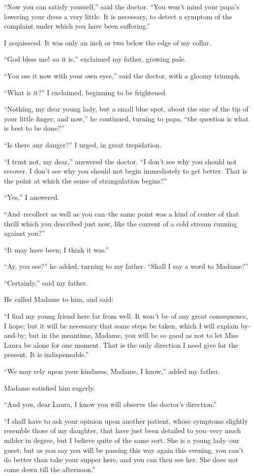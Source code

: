 \documentclass[11pt,twoside,makeidx,hidelinks,]{memoir}
\begin{document}
``Now you can satisfy yourself,'' said the doctor. ``You won't mind your
papa's lowering your dress a very little. It is necessary, to detect a
symptom of the complaint under which you have been suffering.''

I acquiesced. It was only an inch or two below the edge of my collar.

``God bless me!--so it is,'' exclaimed my father, growing pale.

``You see it now with your own eyes,'' said the doctor, with a gloomy
triumph.

``What is it?'' I exclaimed, beginning to be frightened.

``Nothing, my dear young lady, but a small blue spot, about the size of
the tip of your little finger; and now,'' he continued, turning to papa,
``the question is what is best to be done?''

``Is there any danger?'' I urged, in great trepidation.

``I trust not, my dear,'' answered the doctor. ``I don't see why you should
not recover. I don't see why you should not begin immediately to get
better. That is the point at which the sense of strangulation begins?''

``Yes,'' I answered.

``And--recollect as well as you can--the same point was a kind of center
of that thrill which you described just now, like the current of a cold
stream running against you?''

``It may have been; I think it was.''

``Ay, you see?'' he added, turning to my father. ``Shall I say a word to
Madame?''

``Certainly,'' said my father.

He called Madame to him, and said:

``I find my young friend here far from well. It won't be of any great
consequence, I hope; but it will be necessary that some steps be taken,
which I will explain by-and-by; but in the meantime, Madame, you will
be so good as not to let Miss Laura be alone for one moment. That is the
only direction I need give for the present. It is indispensable.''

``We may rely upon your kindness, Madame, I know,'' added my father.

Madame satisfied him eagerly.

``And you, dear Laura, I know you will observe the doctor's direction.''

``I shall have to ask your opinion upon another patient, whose symptoms
slightly resemble those of my daughter, that have just been detailed to
you--very much milder in degree, but I believe quite of the same sort.
She is a young lady--our guest; but as you say you will be passing this
way again this evening, you can't do better than take your supper here,
and you can then see her. She does not come down till the afternoon.''
\end{document}
